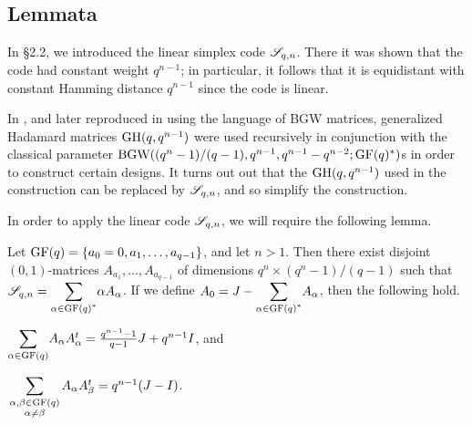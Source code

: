 \documentclass[../../../main]{subfiles}
\begin{document}
\subsection{Lemmata}

 In \S2.2, we introduced the linear simplex code $\mathscr{S}_{q,n}$. There it was shown that the code had constant weight $q^{n-1}$; in particular, it follows that it is equidistant with constant Hamming distance $q^{n-1}$ since the code is linear.
 
 In \cite{rajkundlia}, and later reproduced in \cite{ionin-bgw-bibd} using the language of BGW matrices, generalized Hadamard matrices $\text{GH}(q,q^{n-1})$ were used recursively in conjunction with the classical parameter $\text{BGW}((q^n-1)/(q-1),q^{n-1},q^{n-1}-q^{n-2};\text{GF}(q)^*)$s in order to construct certain designs. It turns out out that the $\text{GH}(q,q^{n-1})$ used in the construction can be replaced by $\mathscr{S}_{q,n}$, and so simplify the construction.
 
 In order to apply the linear code $\mathscr{S}_{q,n}$, we will require the following lemma.
 
 \begin{lem}\label{oa-lem}
  Let $\text{GF}(q)=\{a_0=0,a_1,\dots,a_{q-1}\}$, and let $n>1$. Then there exist disjoint $(0,1)$-matrices $A_{a_1},\dots,A_{a_{q-1}}$ of dimensions $q^n \times (q^n-1)/(q-1)$ such that $\simplex_{q,n}=\ssum_{\alpha \in \gf(q)^*}\alpha A_\alpha$. If we define $A_0=J-\ssum_{\alpha \in \gf(q)^*} A_\alpha$, then the following hold.
  \begin{defenum}
   \item\label{simplex-lem-1} $\ssum_{\alpha \in \gf(q)}A_\alpha A_\alpha^t = \frac{q^{n-1}-1}{q-1}J + q^{n-1}I$, and
   \item\label{simplex-lem-2} $\ssum_{\begin{smallmatrix} \alpha,\beta \in \gf(q) \\ \alpha \neq \beta \end{smallmatrix}}A_\alpha A_\beta^t = q^{n-1}(J-I)$.
  \end{defenum}
 \end{lem}
 
\end{document}
